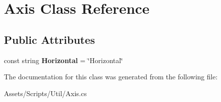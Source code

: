 \hypertarget{class_axis}{}\section{Axis Class Reference}
\label{class_axis}
\subsection*{Public Attributes}
\begin{DoxyCompactItemize}
\item 
const string {\bfseries Horizontal} = \char`\"{}Horizontal\char`\"{}\hypertarget{class_axis_a1ea198bb2d7386523d9586a3a208e052}{}\label{class_axis_a1ea198bb2d7386523d9586a3a208e052}

\end{DoxyCompactItemize}


The documentation for this class was generated from the following file\+:\begin{DoxyCompactItemize}
\item 
Assets/\+Scripts/\+Util/Axis.\+cs\end{DoxyCompactItemize}
